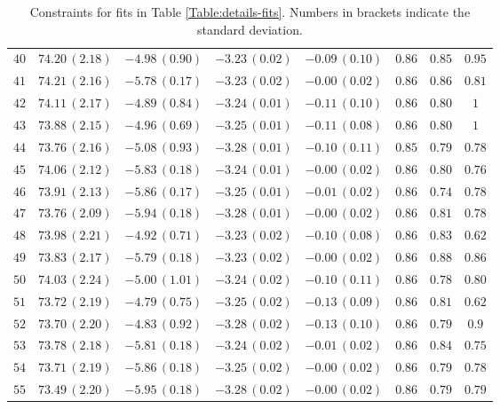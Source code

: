\begin{table}
{\begin{tabular}{cccccccc}
$ 40 $ & $74.20\,(2.18)$ & $-4.98\,(0.90)$ & $-3.23\,(0.02)$ & $-0.09\,(0.10) $ & $0.86 $ & $ 0.85$ & $ 0.95 $\\
$ 41 $ & $74.21\,(2.16)$ & $-5.78\,(0.17)$ & $-3.23\,(0.02)$ & $-0.00\,(0.02) $ & $0.86 $ & $ 0.86$ & $ 0.81 $\\
$ 42 $ & $74.11\,(2.17)$ & $-4.89\,(0.84)$ & $-3.24\,(0.01)$ & $-0.11\,(0.10) $ & $0.86 $ & $ 0.80$ & $ 1$\\
$ 43 $ & $73.88\,(2.15)$ & $-4.96\,(0.69)$ & $-3.25\,(0.01)$ & $-0.11\,(0.08) $ & $0.86 $ & $ 0.80 $ & $1 $\\
$ 44 $ & $73.76\,(2.16)$ & $-5.08\,(0.93)$ & $-3.28\,(0.01)$ & $-0.10\,(0.11) $ & $0.85 $ & $ 0.79$ & $ 0.78 $\\
$ 45 $ & $74.06\,(2.12)$ & $-5.83\,(0.18)$ & $-3.24\,(0.01)$ & $-0.00\,(0.02) $ & $0.86 $ & $ 0.80$ & $ 0.76 $\\
$ 46 $ & $73.91\,(2.13)$ & $-5.86\,(0.17)$ & $-3.25\,(0.01)$ & $-0.01\,(0.02) $ & $0.86 $ & $ 0.74$ & $ 0.78$\\
$ 47 $ & $73.76\,(2.09)$ & $-5.94\,(0.18)$ & $-3.28\,(0.01)$ & $-0.00\,(0.02) $ & $ 0.86 $ & $0.81 $ & $ 0.78$\\
$ 48 $ & $73.98\,(2.21)$ & $-4.92\,(0.71)$ & $-3.23\,(0.02)$ & $-0.10\,(0.08) $ & $0.86 $ & $0.83 $ & $ 0.62 $\\
$ 49 $ & $73.83\,(2.17)$ & $-5.79\,(0.18)$ & $-3.23\,(0.02)$ & $-0.00\,(0.02) $ & $ 0.86$ & $0.88 $ & $ 0.86 $\\
$ 50 $ & $74.03\,(2.24)$ & $-5.00\,(1.01)$ & $-3.24\,(0.02)$ & $-0.10\,(0.11) $ & $0.86 $ & $0.78 $ & $0.80 $\\
$ 51 $ & $73.72\,(2.19)$ & $-4.79\,(0.75)$ & $-3.25\,(0.02)$ & $-0.13\,(0.09) $ & $ 0.86$ & $0.81 $ & $ 0.62 $\\
$ 52 $ & $73.70\,(2.20)$ & $-4.83\,(0.92)$ & $-3.28\,(0.02)$ & $-0.13\,(0.10) $ & $ 0.86$ & $0.79 $ & $ 0.9$\\
$ 53 $ & $73.78\,(2.18)$ & $-5.81\,(0.18)$ & $-3.24\,(0.02)$ & $-0.01\,(0.02) $ & $ 0.86$ & $ 0.84$ & $ 0.75$\\
$ 54 $ & $73.71\,(2.19)$ & $-5.86\,(0.18)$ & $-3.25\,(0.02)$ & $-0.00\,(0.02) $ & $0.86 $ & $ 0.79 $ & $ 0.78 $\\
$ 55 $ & $73.49\,(2.20)$ & $-5.95\,(0.18)$ & $-3.28\,(0.02)$ & $-0.00\,(0.02) $ & $0.86 $ & $0.79 $ & $ 0.79$\\
\hline
\end{tabular}}
\caption{\label{Table:Constraints-main-analysis} Constraints for fits in Table \ref{Table:details-fits}. Numbers in brackets indicate the standard deviation.}
\label{Table:Constraints-main-analysis}
\end{table}


